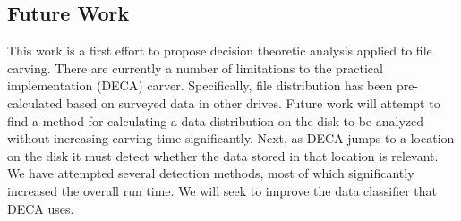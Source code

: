 \documentclass[final,5p,times,twocolumn,authoryear]{elsarticle}
\begin{document}
\subsection{Future Work}
This work is a first effort to propose decision theoretic analysis applied to file carving. There are currently a number of limitations to the practical implementation (DECA) carver. Specifically, file distribution has been pre-calculated based on surveyed data in other drives. Future work will attempt to find a method for calculating a data distribution on the disk to be analyzed without increasing carving time significantly. Next, as DECA jumps to a location on the disk it must detect whether the data stored in that location is relevant. We have attempted several detection methods, most of which significantly increased the overall run time. We will seek to improve the data classifier that DECA uses. 




 

\end{document}

